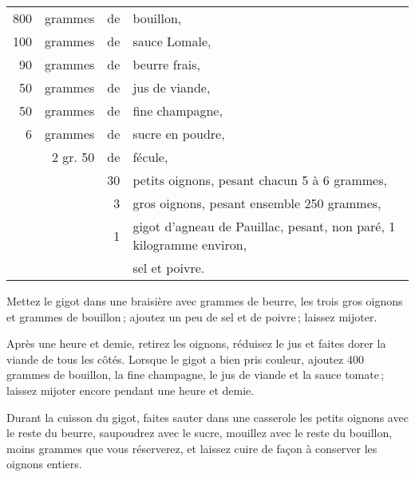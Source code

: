 \footnotesize
\begin{longtable}{rrrp{16em}}
    800 & grammes  & de & bouillon,                                                                       \\
    100 & grammes  & de & sauce Lomale,                                                                   \\
     90 & grammes  & de & beurre frais,                                                                   \\
     50 & grammes  & de & jus de viande,                                                                  \\
     50 & grammes  & de & fine champagne,                                                                 \\
      6 & grammes  & de & sucre en poudre,                                                                \\
        & 2 gr. 50 & de & fécule,                                                                         \\
        &          & 30 & petits oignons, pesant chacun 5 à 6 grammes,                                    \\
        &          &  3 & gros oignons, pesant ensemble 250 grammes,                                      \\
        &          &  1 & gigot d'agneau de Pauillac, pesant, non paré, 1 kilogramme environ,             \\
        &          &    & sel et poivre.                                                                  \\
\end{longtable}
\normalsize

Mettez le gigot dans une braisière avec {\mmm} grammes de beurre, les
trois gros oignons et {\mmm} grammes de bouillon ; ajoutez un peu de sel
et de poivre ; laissez mijoter.

Après une heure et demie, retirez les oignons, réduisez le jus et faites dorer
la viande de tous les côtés. Lorsque le gigot a bien pris couleur, ajoutez 400
grammes de bouillon, la fine champagne, le jus de viande et la sauce tomate ;
laissez mijoter encore pendant une heure et demie.

Durant la cuisson du gigot, faites sauter dans une casserole les {\mmm}
petits oignons avec le reste du beurre, saupoudrez avec le sucre, mouillez avec
le reste du bouillon, moins {\mmm} grammes que vous réserverez, et
laissez cuire de façon à conserver les oignons entiers.

